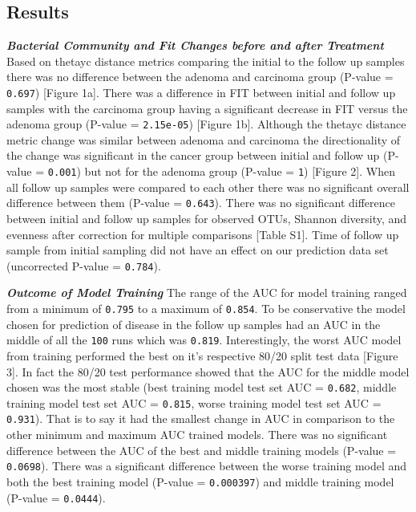 \documentclass[12pt,]{article}
\begin{document}
\newpage

\subsection{Results}\label{results}

\textbf{\emph{Bacterial Community and Fit Changes before and after
Treatment}} Based on thetayc distance metrics comparing the initial to
the follow up samples there was no difference between the adenoma and
carcinoma group (P-value = \texttt{0.697}) {[}Figure 1a{]}. There was a
difference in FIT between initial and follow up samples with the
carcinoma group having a significant decrease in FIT versus the adenoma
group (P-value = \texttt{2.15e-05}) {[}Figure 1b{]}. Although the
thetayc distance metric change was similar between adenoma and carcinoma
the directionality of the change was significant in the cancer group
between initial and follow up (P-value = \texttt{0.001}) but not for the
adenoma group (P-value = \texttt{1}) {[}Figure 2{]}. When all follow up
samples were compared to each other there was no significant overall
difference between them (P-value = \texttt{0.643}). There was no
significant difference between initial and follow up samples for
observed OTUs, Shannon diversity, and evenness after correction for
multiple comparisons {[}Table S1{]}. Time of follow up sample from
initial sampling did not have an effect on our prediction data set
(uncorrected P-value = \texttt{0.784}).

\textbf{\emph{Outcome of Model Training}} The range of the AUC for model
training ranged from a minimum of \texttt{0.795} to a maximum of
\texttt{0.854}. To be conservative the model chosen for prediction of
disease in the follow up samples had an AUC in the middle of all the
\texttt{100} runs which was \texttt{0.819}. Interestingly, the worst AUC
model from training performed the best on it's respective 80/20 split
test data {[}Figure 3{]}. In fact the 80/20 test performance showed that
the AUC for the middle model chosen was the most stable (best training
model test set AUC = \texttt{0.682}, middle training model test set AUC
= \texttt{0.815}, worse training model test set AUC = \texttt{0.931}).
That is to say it had the smallest change in AUC in comparison to the
other minimum and maximum AUC trained models. There was no significant
difference between the AUC of the best and middle training models
(P-value = \texttt{0.0698}). There was a significant difference between
the worse training model and both the best training model (P-value =
\texttt{0.000397}) and middle training model (P-value =
\texttt{0.0444}).
\end{document}
